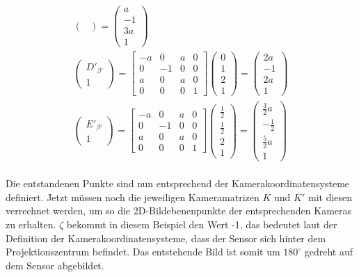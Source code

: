 \begin{gather}
\begin{pmatrix}
	\end{pmatrix}
	=
	\begin{pmatrix}
		a\\-1\\3a\\1
	\end{pmatrix}\\
	\begin{pmatrix}
		D'_{\beta'}\\1
	\end{pmatrix}
	=
	\begin{bmatrix}
		-a&0&a&0\\
		0&-1&0&0\\
		a&0&a&0\\
		0&0&0&1
	\end{bmatrix}
	\begin{pmatrix}
		0\\1\\2\\1
	\end{pmatrix}
	=
	\begin{pmatrix}
		2a\\-1\\2a\\1
	\end{pmatrix}\\
	\begin{pmatrix}
	E'_{\beta'}\\1
\end{pmatrix}
=
\begin{bmatrix}
	-a&0&a&0\\
	0&-1&0&0\\
	a&0&a&0\\
	0&0&0&1
\end{bmatrix}
\begin{pmatrix}
	\frac{1}{2}\\\frac{1}{2}\\2\\1
\end{pmatrix}
=
\begin{pmatrix}
	\frac{3}{2}a\\-\frac{1}{2}\\\frac{5}{2}a\\1
\end{pmatrix}
\end{gather}\\

Die entstandenen Punkte sind nun entsprechend der Kamerakoordinatensysteme definiert. Jetzt müssen noch die jeweiligen Kameramatrizen $K$ und $K'$ mit diesen verrechnet werden, um so die 2D-Bildebenenpunkte der entsprechenden Kameras zu erhalten. $\zeta$ bekommt in diesem Beispiel den Wert -1, das bedeutet laut der Definition der Kamerakoordinatensysteme, dass der Sensor sich hinter dem Projektionszentrum befindet. Das entstehende Bild ist somit um \ensuremath{180^\circ} gedreht auf dem Sensor abgebildet.


